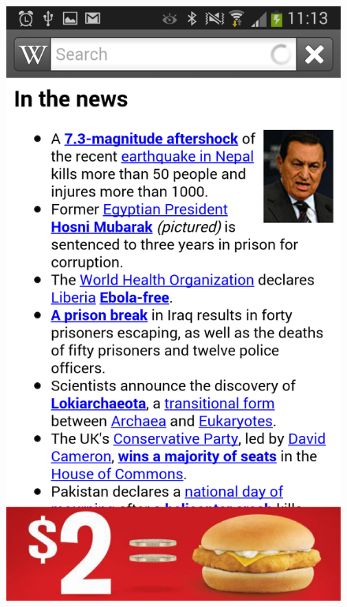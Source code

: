 \begin{figure}
\begin{center}
\includegraphics[scale=0.25]{Images/classicalad_banner.png}

\end{center}
\end{figure}
